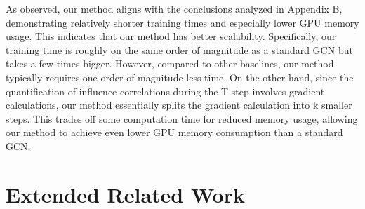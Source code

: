 As observed, our method aligns with the conclusions analyzed in Appendix B, demonstrating relatively shorter training times and especially lower GPU memory usage. This indicates that our method has better scalability. 
Specifically, our training time is roughly on the same order of magnitude as a standard GCN but takes a few times bigger. However, compared to other baselines, our method typically requires one order of magnitude less time. On the other hand, since the quantification of influence correlations during the T step involves gradient calculations, our method essentially splits the gradient calculation into k smaller steps. This trades off some computation time for reduced memory usage, allowing our method to achieve even lower GPU memory consumption than a standard GCN.




\section{Extended Related Work}


